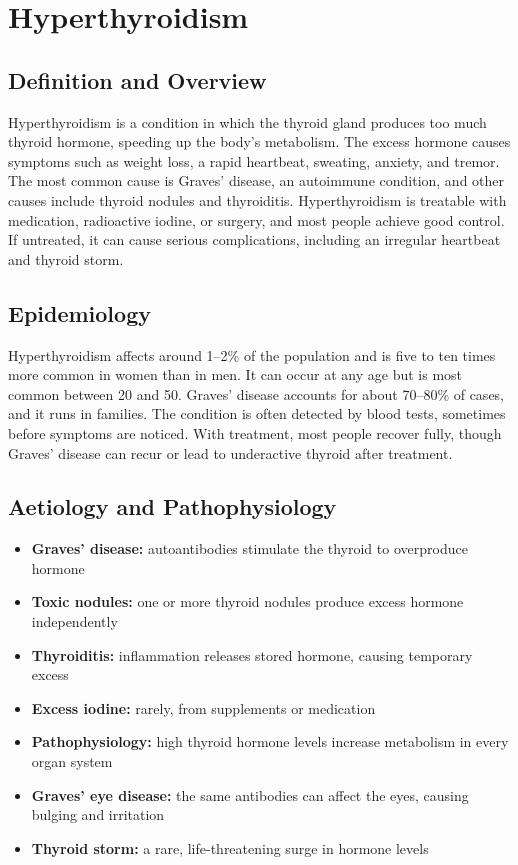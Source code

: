 \chapter{Hyperthyroidism}

\section*{Definition and Overview}
Hyperthyroidism is a condition in which the thyroid gland produces too much thyroid hormone, speeding up the body's metabolism. The excess hormone causes symptoms such as weight loss, a rapid heartbeat, sweating, anxiety, and tremor. The most common cause is Graves' disease, an autoimmune condition, and other causes include thyroid nodules and thyroiditis. Hyperthyroidism is treatable with medication, radioactive iodine, or surgery, and most people achieve good control. If untreated, it can cause serious complications, including an irregular heartbeat and thyroid storm.

\section*{Epidemiology}
Hyperthyroidism affects around 1--2\% of the population and is five to ten times more common in women than in men. It can occur at any age but is most common between 20 and 50. Graves' disease accounts for about 70--80\% of cases, and it runs in families. The condition is often detected by blood tests, sometimes before symptoms are noticed. With treatment, most people recover fully, though Graves' disease can recur or lead to underactive thyroid after treatment.

\section*{Aetiology and Pathophysiology}
\begin{itemize}
    \item \textbf{Graves' disease:} autoantibodies stimulate the thyroid to overproduce hormone
    \item \textbf{Toxic nodules:} one or more thyroid nodules produce excess hormone independently
    \item \textbf{Thyroiditis:} inflammation releases stored hormone, causing temporary excess
    \item \textbf{Excess iodine:} rarely, from supplements or medication
    \item \textbf{Pathophysiology:} high thyroid hormone levels increase metabolism in every organ system
    \item \textbf{Graves' eye disease:} the same antibodies can affect the eyes, causing bulging and irritation
    \item \textbf{Thyroid storm:} a rare, life-threatening surge in hormone levels
\end{itemize}

